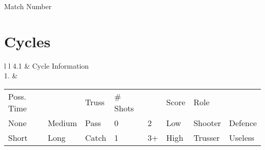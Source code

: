 \documentclass[english,pdf,pagemark,stamp]{sdaps}
\begin{document}
\begin{questionnaire}[noinfo]
\begin{multicols}{3}
\begin{choicegroup}{\hspace{22 mm}Match Number}
     \end{choicegroup}

\end{multicols}

    \section{Cycles}

\begin{tabular}{l l}
4.1 & Cycle Information  \\
1. &
\begin{tabular}{ l l | l | l l | l | l l}
  Poss. Time& & Truss & \# Shots & & Score & Role & \\
  \checkbox \hspace{1 mm} None & \checkbox \hspace{1 mm} Medium \hspace{3 mm} & \checkbox \hspace{1 mm} Pass \hspace{1 mm} & 0 \hspace{1 mm} \checkbox & 2  \hspace{2 mm} \checkbox \hspace{1 mm} & \checkbox \hspace{1 mm} Low \hspace{1 mm} &\checkbox \hspace{1 mm} Shooter & \checkbox \hspace{1 mm} Defence \\
  \checkbox \hspace{1 mm} Short & \checkbox \hspace{1 mm} Long \hspace{3 mm} & \checkbox \hspace{1 mm} Catch \hspace{1 mm} & 1 \hspace{1 mm} \checkbox & 3+  \checkbox \hspace{1 mm} & \checkbox \hspace{1 mm} High \hspace{3 mm} & \checkbox \hspace{1 mm} Trusser & \checkbox \hspace{1 mm} Useless\\

\end{tabular}
\end{tabular}
\end{questionnaire}
\end{document}
